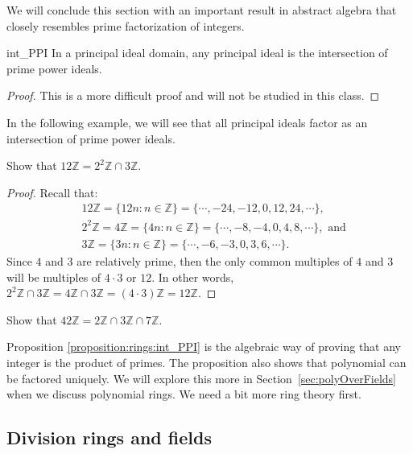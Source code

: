 We will conclude this section with an important result in abstract algebra that closely resembles prime factorization of integers.

\begin{prop}{int_PPI}
In a principal ideal domain, any principal ideal is the intersection of prime power ideals.\\
\end{prop}

\begin{proof}
This is a more difficult proof and will not be studied in this class.
\end{proof}

In the following example, we will see that all principal ideals factor as an intersection of prime power ideals.

\begin{example}{}
Show that $12{\mathbb Z}=2^2{\mathbb Z}\cap 3{\mathbb Z}$.
\end{example}

\begin{proof}
Recall that:
\begin{align*}
&12{\mathbb Z}=\{12n:n\in{\mathbb Z}\}=\{\cdots,-24,-12,0,12,24,\cdots\},\\
&2^2{\mathbb Z}=4{\mathbb Z}=\{4n:n\in{\mathbb Z}\}=\{\cdots,-8,-4,0,4,8,\cdots\}, \text{ and}\\ &3{\mathbb Z}=\{3n:n\in{\mathbb Z}\}=\{\cdots,-6,-3,0,3,6,\cdots\}.  
\end{align*}
Since $4$ and $3$ are relatively prime, then the only common multiples of $4$ and $3$ will be multiples of $4\cdot 3$ or $12$.  In other words, $2^2{\mathbb Z}\cap 3{\mathbb Z}=4{\mathbb Z}\cap 3{\mathbb Z}=(4\cdot 3){\mathbb Z}=12{\mathbb Z}$.
\end{proof}

\begin{exercise}{}
Show that $42{\mathbb Z}=2{\mathbb Z}\cap 3{\mathbb Z}\cap 7{\mathbb Z}$.
\end{exercise}

Proposition \ref{proposition:rings:int_PPI} is the algebraic way of proving that any integer is the product of primes. The proposition also shows that polynomial can be factored uniquely.  We will explore this more in Section~\ref{sec:polyOverFields} when we discuss polynomial rings.  We need a bit more ring theory first.

\subsection{Division rings and fields\quad
{}}



